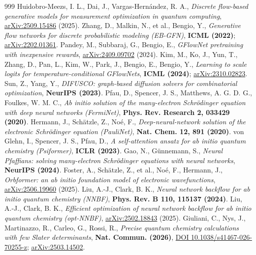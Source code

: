 \documentclass[11pt]{article}
\begin{document}
\begin{thebibliography}{999}
 Huidobro-Meezs, I. L., Dai, J., Vargas-Hern\'andez, R. A., \emph{Discrete flow-based generative models for measurement optimization in quantum computing}, \href{https://arxiv.org/abs/2509.15486}{arXiv:2509.15486} (2025).
 Zhang, D., Malkin, N., et al., Bengio, Y., \emph{Generative flow networks for discrete probabilistic modeling (EB-GFN)}, \textbf{ICML (2022)}; \href{https://arxiv.org/abs/2202.01361}{arXiv:2202.01361}.
 Pandey, M., Subbaraj, G., Bengio, E., \emph{GFlowNet pretraining with inexpensive rewards}, \href{https://arxiv.org/abs/2409.09702}{arXiv:2409.09702} (2024).
 Kim, M., Ko, J., Yun, T., Zhang, D., Pan, L., Kim, W., Park, J., Bengio, E., Bengio, Y., \emph{Learning to scale logits for temperature-conditional GFlowNets}, \textbf{ICML (2024)}; \href{https://arxiv.org/abs/2310.02823}{arXiv:2310.02823}.
 Sun, Z., Yang, Y., \emph{DIFUSCO: graph-based diffusion solvers for combinatorial optimization}, \textbf{NeurIPS (2023)}.
 Pfau, D., Spencer, J. S., Matthews, A. G. D. G., Foulkes, W. M. C., \emph{Ab initio solution of the many-electron Schrödinger equation with deep neural networks (FermiNet)}, \textbf{Phys. Rev. Research 2, 033429 (2020)}.
 Hermann, J., Schätzle, Z., Noé, F., \emph{Deep-neural-network solution of the electronic Schrödinger equation (PauliNet)}, \textbf{Nat. Chem. 12, 891 (2020)}.
 von Glehn, I., Spencer, J. S., Pfau, D., \emph{A self-attention ansatz for ab initio quantum chemistry (Psiformer)}, \textbf{ICLR (2023)}.
 Gao, N., Günnemann, S., \emph{Neural Pfaffians: solving many-electron Schrödinger equations with neural networks}, \textbf{NeurIPS (2024)}.
 Foster, A., Schätzle, Z., et al., Noé, F., Hermann, J., \emph{Orbformer: an ab initio foundation model of electronic wavefunctions}, \href{https://arxiv.org/abs/2506.19960}{arXiv:2506.19960} (2025).
 Liu, A.-J., Clark, B. K., \emph{Neural network backflow for ab initio quantum chemistry (NNBF)}, \textbf{Phys. Rev. B 110, 115137 (2024)}.
 Liu, A.-J., Clark, B. K., \emph{Efficient optimization of neural network backflow for ab initio quantum chemistry (opt-NNBF)}, \href{https://arxiv.org/abs/2502.18843}{arXiv:2502.18843} (2025).
 Giuliani, C., Nys, J., Martinazzo, R., Carleo, G., Rossi, R., \emph{Precise quantum chemistry calculations with few Slater determinants}, \textbf{Nat. Commun. (2026)}, \href{https://doi.org/10.1038/s41467-026-70255-z}{DOI 10.1038/s41467-026-70255-z}; \href{https://arxiv.org/abs/2503.14502}{arXiv:2503.14502}.

\end{thebibliography}
\end{document}

